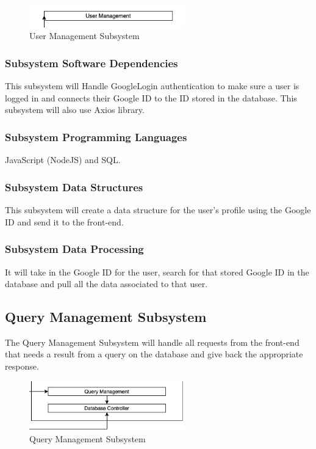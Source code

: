 \begin{figure}[h!]
	\centering
 	\includegraphics[width=0.60\textwidth]{images/UserManagement.png}
 \caption{User Management Subsystem}
\end{figure}


\subsubsection{Subsystem Software Dependencies}
This subsystem will Handle GoogleLogin authentication to make sure a user is logged in and connects their Google ID to the ID stored in the database. This subsystem will also use Axios library.

\subsubsection{Subsystem Programming Languages}
JavaScript (NodeJS) and SQL.

\subsubsection{Subsystem Data Structures}
This subsystem will create a data structure for the user's profile using the Google ID and send it to the front-end.

\subsubsection{Subsystem Data Processing}
It will take in the Google ID for the user, search for that stored Google ID in the database and pull all the data associated to that user.

\subsection{Query Management Subsystem}
The Query Management Subsystem will handle all requests from the front-end that needs a result from
a query on the database and give back the appropriate response.

\begin{figure}[h!]
	\centering
 	\includegraphics[width=0.60\textwidth]{images/Screenshot (61).png}
 \caption{Query Management Subsystem}
\end{figure}


